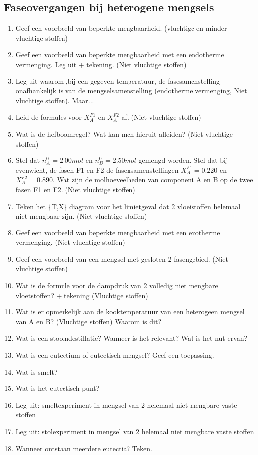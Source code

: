\documentclass[a4paper,12pt]{article}
\begin{document}
    \subsection*{Faseovergangen bij heterogene mengsels}
    \begin{enumerate}
        \item Geef een voorbeeld van beperkte mengbaarheid. (vluchtige en minder vluchtige stoffen)
        \item Geef een voorbeeld van beperkte mengbaarheid met een endotherme vermenging. Leg uit + tekening. (Niet vluchtige stoffen)
        \item Leg uit waarom ,bij een gegeven temperatuur, de fasesamenstelling onafhankelijk is van de mengselsamenstelling (endotherme vermenging, Niet vluchtige stoffen). Maar...
        \item Leid de formules voor $X_A^{F1}$ en $X_A^{F2}$ af. (Niet vluchtige stoffen)
        \item Wat is de hefboomregel? Wat kan men hieruit afleiden? (Niet vluchtige stoffen)
        \item Stel dat $n_A^0 = 2.00mol$ en $n_B^0 = 2.50mol$ gemengd worden. Stel dat bij evenwicht, de fasen F1 en F2 de fasensamenstellingen $X_A^{F1} = 0.220$ en $X_A^{F2} = 0.890$. Wat zijn de molhoeveelheden van component A en B op de twee fasen F1 en F2. (Niet vluchtige stoffen)
        \item Teken het \{T,X\} diagram voor het limietgeval dat 2 vloeistoffen helemaal niet mengbaar zijn. (Niet vluchtige stoffen)
        \item Geef een voorbeeld van beperkte mengbaarheid met een exotherme vermenging. (Niet vluchtige stoffen)
        \item Geef een voorbeeld van een mengsel met gesloten 2 fasengebied. (Niet vluchtige stoffen)
        \item Wat is de formule voor de dampdruk van 2 volledig niet mengbare vloetstoffen? + tekening (Vluchtige stoffen)
        \item Wat is er opmerkelijk aan de kooktemperatuur van een heterogeen mengsel van A en B? (Vluchtige stoffen) Waarom is dit?
        \item Wat is een stoomdestillatie? Wanneer is het relevant? Wat is het nut ervan?
        \item Wat is een eutectium of eutectisch mengsel? Geef een toepassing.
        \item Wat is smelt?
        \item Wat is het eutectisch punt?
        \item Leg uit: smeltexperiment in mengsel van 2 helemaal niet mengbare vaste stoffen
        \item Leg uit: stolexperiment in mengsel van 2 helemaal niet mengbare vaste stoffen
        \item Wanneer ontstaan meerdere eutectia? Teken.
    \end{enumerate}
\end{document}
